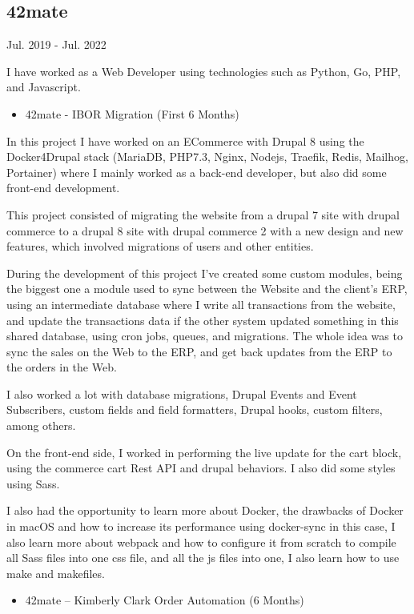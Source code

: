 \documentclass[11pt]{article}
\begin{document}
\subsection{42mate}
\label{sec:org3fb81e7}
Jul. 2019 - Jul. 2022

I have worked as a Web Developer using technologies such as Python, Go, PHP, and Javascript.  

\begin{itemize}
\item 42mate - IBOR Migration (First 6 Months)
\end{itemize}

In this project I have worked on an ECommerce with Drupal 8 using the Docker4Drupal stack (MariaDB, PHP7.3, Nginx, Nodejs, Traefik, Redis, Mailhog, Portainer) where I mainly worked as a back-end developer, but also did some front-end development.

This project consisted of migrating the website from a drupal 7 site with drupal commerce to a drupal 8 site with drupal commerce 2 with a new design and new features, which involved migrations of users and other entities.

During the development of this project I’ve created some custom modules, being the biggest one a module used to sync between the Website and the client's ERP, using an intermediate database where I write all transactions from the website, and update the transactions data if the other system updated something in this shared database, using cron jobs, queues, and migrations. The whole idea was to sync the sales on the Web to the ERP, and get back updates from the ERP to the orders in the Web.

I also worked a lot with database migrations, Drupal Events and Event Subscribers, custom fields and field formatters, Drupal hooks, custom filters, among others.

On the front-end side, I worked in performing the live update for the cart block, using the commerce cart Rest API and drupal behaviors. I also did some styles using Sass.

I also had the opportunity to learn more about Docker, the drawbacks of Docker in macOS and how to increase its performance using docker-sync in this case, I also learn more about webpack and how to configure it from scratch to compile all Sass files into one css file, and all the js files into one, I also learn how to use make and makefiles.

\begin{itemize}
\item 42mate – Kimberly Clark Order Automation (6 Months)
\end{itemize}
\end{document}
